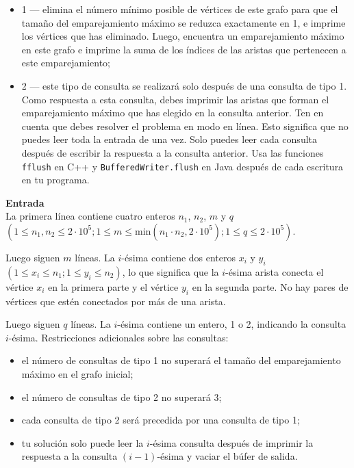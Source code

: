 \documentclass{article}
\begin{document}
\begin{itemize}
    \item 1 — elimina el número mínimo posible de vértices de este grafo para que el tamaño del emparejamiento máximo se reduzca exactamente en 1, e imprime los vértices que has eliminado. Luego, encuentra un emparejamiento máximo en este grafo e imprime la suma de los índices de las aristas que pertenecen a este emparejamiento;
    \item 2 — este tipo de consulta se realizará solo después de una consulta de tipo 1. Como respuesta a esta consulta, debes imprimir las aristas que forman el emparejamiento máximo que has elegido en la consulta anterior.
          Ten en cuenta que debes resolver el problema en modo en línea. Esto significa que no puedes leer toda la entrada de una vez. Solo puedes leer cada consulta después de escribir la respuesta a la consulta anterior. Usa las funciones \texttt{fflush} en C++ y \texttt{BufferedWriter.flush} en Java después de cada escritura en tu programa.
\end{itemize}

\textbf{Entrada}\\

La primera línea contiene cuatro enteros $n_1$, $n_2$, $m$ y $q$ $(1 \leq n_1,n_2 \leq 2\cdot 10^5; 1 \leq m \leq \text{min}(n_1 \cdot n_2, 2 \cdot 10^5); 1 \leq q \leq 2\cdot 10^5)$.

Luego siguen $m$ líneas. La $i$-ésima contiene dos enteros $x_i$ y $y_i$ $(1\leq x_i \leq n_1; 1 \leq y_i \leq n_2)$, lo que significa que la $i$-ésima arista conecta el vértice $x_i$ en la primera parte y el vértice $y_i$ en la segunda parte. No hay pares de vértices que estén conectados por más de una arista.

Luego siguen $q$ líneas. La $i$-ésima contiene un entero, 1 o 2, indicando la consulta $i$-ésima. Restricciones adicionales sobre las consultas:

\begin{itemize}
    \item el número de consultas de tipo 1 no superará el tamaño del emparejamiento máximo en el grafo inicial;
    \item el número de consultas de tipo 2 no superará 3;
    \item cada consulta de tipo 2 será precedida por una consulta de tipo 1;
    \item tu solución solo puede leer la $i$-ésima consulta después de imprimir la respuesta a la consulta $(i-1)$-ésima y vaciar el búfer de salida.
\end{itemize}
\end{document}
